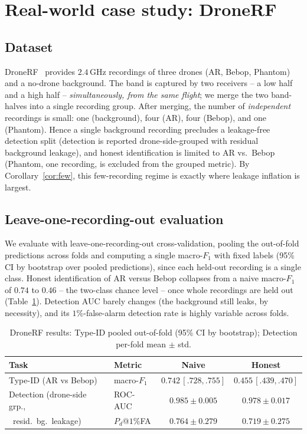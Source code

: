 \documentclass[11pt]{article}
\begin{document}
\section{Real-world case study: DroneRF}
\label{sec:dronerf}
\subsection{Dataset}
DroneRF~\cite{dronerf} provides $2.4$\,GHz recordings of three drones (AR, Bebop, Phantom) and a no-drone background. The band is captured by two receivers -- a low half and a high half -- \emph{simultaneously, from the same flight}; we merge the two band-halves into a single recording group. After merging, the number of \emph{independent} recordings is small: one (background), four (AR), four (Bebop), and one (Phantom). Hence a single background recording precludes a leakage-free detection split (detection is reported drone-side-grouped with residual background leakage), and honest identification is limited to AR vs.\ Bebop (Phantom, one recording, is excluded from the grouped metric). By Corollary~\ref{cor:few}, this few-recording regime is exactly where leakage inflation is largest.

\subsection{Leave-one-recording-out evaluation}
We evaluate with leave-one-recording-out cross-validation, pooling the out-of-fold predictions across folds and computing a single macro-$F_1$ with fixed labels (95\% CI by bootstrap over pooled predictions), since each held-out recording is a single class. Honest identification of AR versus Bebop collapses from a naive macro-$F_1$ of $0.74$ to $0.46$ -- the two-class chance level -- once whole recordings are held out (Table~\ref{tab:loro}). Detection AUC barely changes (the background still leaks, by necessity), and its $1\%$-false-alarm detection rate is highly variable across folds.

\begin{table}[t]\centering
\caption{DroneRF results: Type-ID pooled out-of-fold (95\% CI by bootstrap); Detection per-fold mean $\pm$ std.}
\label{tab:loro}
\begin{tabular}{llcc}
\toprule
Task & Metric & Naive & Honest \\
\midrule
Type-ID (AR vs Bebop) & macro-$F_1$ & $0.742\,[.728,.755]$ & $\mathbf{0.455\,[.439,.470]}$ \\
Detection (drone-side grp., & ROC-AUC & $0.985\pm0.005$ & $0.978\pm0.017$ \\
\ resid.\ bg.\ leakage) & $P_d$@$1\%$FA & $0.764\pm0.279$ & $0.719\pm0.275$ \\
\bottomrule
\end{tabular}
\end{table}
\end{document}
